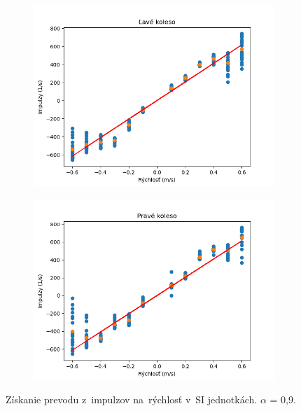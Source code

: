 \begin{figure}[!htbp]
	\begin{subfigure}{0.5\textwidth}
		\includegraphics[width=\textwidth]{img/lw_09250.png}
	\end{subfigure}
	\hfill
	\begin{subfigure}{0.5\textwidth}
		\includegraphics[width=\textwidth]{img/rw_09250.png}
	\end{subfigure}
	\caption{Získanie prevodu z~impulzov na~rýchlosť v~SI jednotkách. $\alpha$ = 0,9.}
	\label{fig:rw_lw_09250}
\end{figure}

